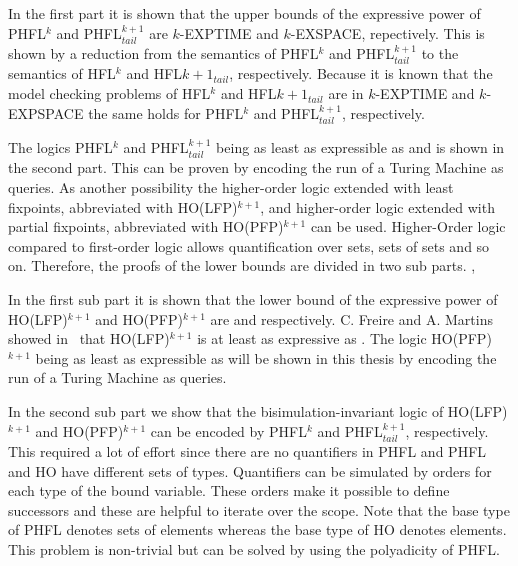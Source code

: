 In the first part it is shown that the upper bounds of the expressive power of PHFL$^k$ and PHFL$^{k+1}_{tail}$ are $k$-EXPTIME and $k$-EXSPACE, repectively. This is shown by a reduction from the semantics of PHFL$^k$ and PHFL$^{k+1}_{tail}$ to the semantics of HFL$^k$ and HFL${k+1}_{tail}$, respectively. Because it is known that the model checking problems of HFL$^k$ and HFL${k+1}_{tail}$ are in $k$-EXPTIME and $k$-EXPSPACE the same holds for PHFL$^k$ and PHFL$^{k+1}_{tail}$, respectively.

The logics PHFL$^k$ and PHFL$^{k+1}_{tail}$ being as least as expressible as  and  is shown in the second part. This can be proven by encoding the run of a Turing Machine as queries. As another possibility the higher-order logic extended with least fixpoints, abbreviated with HO(LFP)$^{k+1}$, and higher-order logic extended with partial fixpoints, abbreviated with HO(PFP)$^{k+1}$ can be used. Higher-Order logic compared to first-order logic allows quantification over sets, sets of sets and so on. Therefore, the proofs of the lower bounds are divided in two sub parts. ,

In the first sub part it is shown that the lower bound of the expressive power of HO(LFP)$^{k+1}$ and HO(PFP)$^{k+1}$ are  and  respectively. C. Freire and A. Martins showed in~\cite{freireMartins2011descriptive} that HO(LFP)$^{k+1}$ is at least as expressive as . The logic HO(PFP)$^{k+1}$ being as least as expressible as  will be shown in this thesis by encoding the run of a Turing Machine as queries.

In the second sub part we show that the bisimulation-invariant logic of HO(LFP)$^{k+1}$ and HO(PFP)$^{k+1}$ can be encoded by PHFL$^k$ and PHFL$^{k+1}_{tail}$, respectively. This required a lot of effort since there are no quantifiers in PHFL and PHFL and HO have different sets of types. Quantifiers can be simulated by orders for each type of the bound variable. These orders make it possible to define successors and these are helpful to iterate over the scope. Note that the base type of PHFL denotes sets of elements whereas the base type of HO denotes elements. This problem is non-trivial but can be solved by using the polyadicity of PHFL. 

